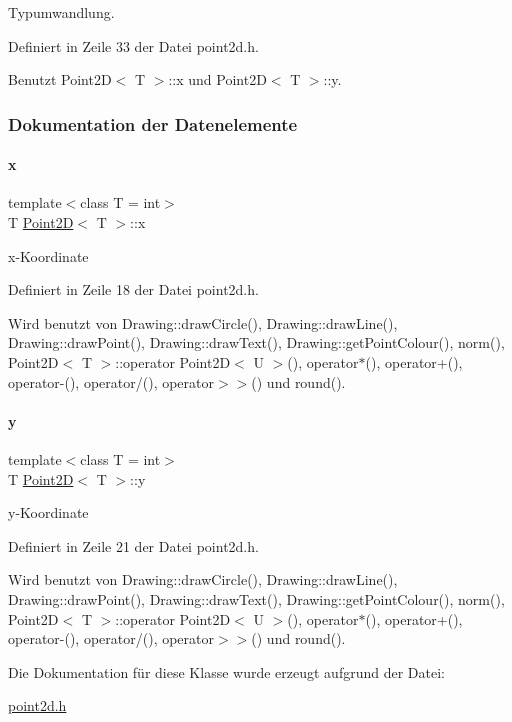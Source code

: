 Typumwandlung. 



Definiert in Zeile 33 der Datei point2d.\+h.



Benutzt Point2\+D$<$ T $>$\+::x und Point2\+D$<$ T $>$\+::y.



\subsubsection{Dokumentation der Datenelemente}
\mbox{\label{classPoint2D_af645991722e4a2285f9aaaaf2e3435cd}} 
\paragraph{\texorpdfstring{x}{x}}
{\footnotesize\ttfamily template$<$class T = int$>$ \\
T \mbox{\hyperlink{classPoint2D}{Point2D}}$<$ T $>$\+::x}



x-\/\+Koordinate 



Definiert in Zeile 18 der Datei point2d.\+h.



Wird benutzt von Drawing\+::draw\+Circle(), Drawing\+::draw\+Line(), Drawing\+::draw\+Point(), Drawing\+::draw\+Text(), Drawing\+::get\+Point\+Colour(), norm(), Point2\+D$<$ T $>$\+::operator Point2\+D$<$ U $>$(), operator$\ast$(), operator+(), operator-\/(), operator/(), operator$>$$>$() und round().

\mbox{\label{classPoint2D_ac9477b55718b628606930d8d4971e835}} 
\paragraph{\texorpdfstring{y}{y}}
{\footnotesize\ttfamily template$<$class T = int$>$ \\
T \mbox{\hyperlink{classPoint2D}{Point2D}}$<$ T $>$\+::y}



y-\/\+Koordinate 



Definiert in Zeile 21 der Datei point2d.\+h.



Wird benutzt von Drawing\+::draw\+Circle(), Drawing\+::draw\+Line(), Drawing\+::draw\+Point(), Drawing\+::draw\+Text(), Drawing\+::get\+Point\+Colour(), norm(), Point2\+D$<$ T $>$\+::operator Point2\+D$<$ U $>$(), operator$\ast$(), operator+(), operator-\/(), operator/(), operator$>$$>$() und round().



Die Dokumentation für diese Klasse wurde erzeugt aufgrund der Datei\+:\begin{DoxyCompactItemize}
\item 
\mbox{\hyperlink{point2d_8h}{point2d.\+h}}\end{DoxyCompactItemize}
